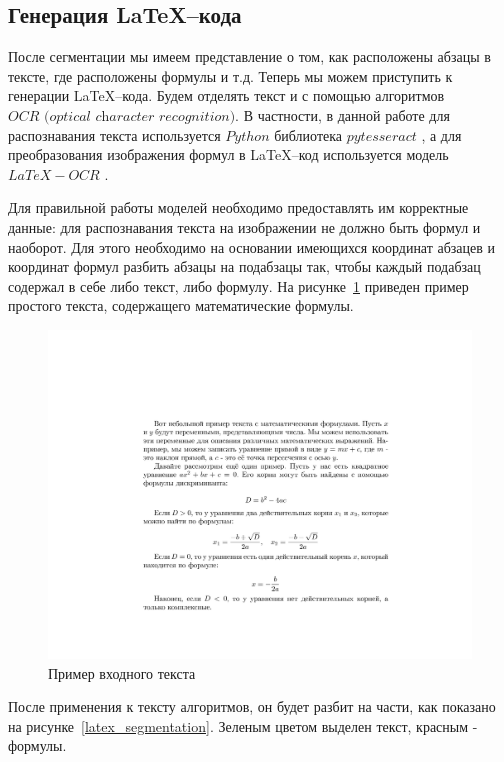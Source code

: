 \subsection{Генерация \LaTeX--кода}

После сегментации мы имеем представление о том, как расположены абзацы в тексте, где расположены формулы и т.д. Теперь мы можем приступить к генерации \LaTeX--кода.
Будем отделять текст и с помощью алгоритмов $\textit{OCR (optical character recognition)}$. В частности, в данной работе для распознавания текста используется $Python$ библиотека $pytesseract$ \cite{pytesseract}, а для преобразования изображения формул в \LaTeX--код используется модель $LaTeX-OCR$ \cite{LaTeX-OCR}.

Для правильной работы моделей необходимо предоставлять им корректные данные: для распознавания текста на изображении не должно быть формул и наоборот. Для этого необходимо на основании имеющихся координат абзацев и координат формул разбить абзацы на подабзацы так, чтобы каждый подабзац содержал в себе либо текст, либо формулу.
На рисунке~\ref{latex_generate_input} приведен пример простого текста, содержащего математические формулы.

\begin{figure}
    \includegraphics[scale=0.75]{img/latex_generation/input.jpg}
    \caption{Пример входного текста}
    \label{latex_generate_input}
\end{figure}

После применения к тексту алгоритмов, он будет разбит на части, как показано на рисунке~\ref{latex_segmentation}. Зеленым цветом выделен текст, красным - формулы.

